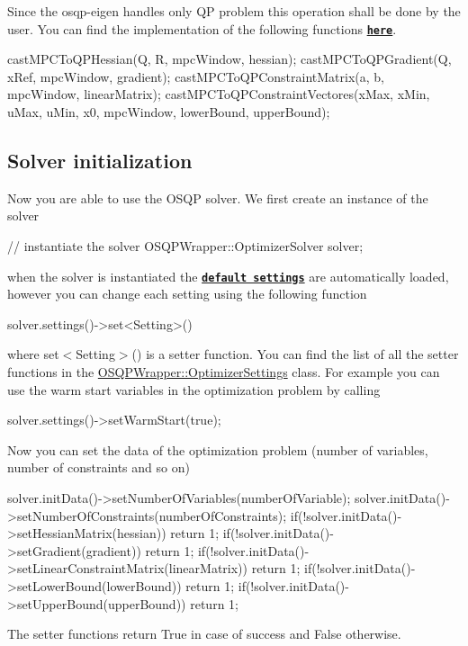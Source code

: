 Since the osqp-\/eigen handles only QP problem this operation shall be done by the user. You can find the implementation of the following functions \href{https://github.com/GiulioRomualdi/osqp-eigen/blob/master/example/src/MPCExample.cpp#L71-L182}{\tt {\bfseries here}}. 
\begin{DoxyCode}
castMPCToQPHessian(Q, R, mpcWindow, hessian);
castMPCToQPGradient(Q, xRef, mpcWindow, gradient);
castMPCToQPConstraintMatrix(a, b, mpcWindow, linearMatrix);
castMPCToQPConstraintVectores(xMax, xMin, uMax, uMin, x0, mpcWindow, lowerBound, upperBound);
\end{DoxyCode}
\hypertarget{index_OSQP_init}{}\subsection{Solver initialization}\label{index_OSQP_init}
Now you are able to use the O\+S\+QP solver. We first create an instance of the solver 
\begin{DoxyCode}
\textcolor{comment}{// instantiate the solver}
OSQPWrapper::OptimizerSolver solver;
\end{DoxyCode}
 when the solver is instantiated the \href{http://osqp.readthedocs.io/en/latest/interfaces/solver_settings.html}{\tt {\bfseries default settings}} are automatically loaded, however you can change each setting using the following function 
\begin{DoxyCode}
solver.settings()->set<Setting>()
\end{DoxyCode}
 where {\ttfamily set$<$\+Setting$>$()} is a setter function. You can find the list of all the setter functions in the {\ttfamily \hyperlink{classOSQPWrapper_1_1OptimizerSettings}{O\+S\+Q\+P\+Wrapper\+::\+Optimizer\+Settings}} class. For example you can use the warm start variables in the optimization problem by calling 
\begin{DoxyCode}
solver.settings()->setWarmStart(\textcolor{keyword}{true});
\end{DoxyCode}


Now you can set the data of the optimization problem (number of variables, number of constraints and so on) 
\begin{DoxyCode}
solver.initData()->setNumberOfVariables(numberOfVariable);
solver.initData()->setNumberOfConstraints(numberOfConstraints);
\textcolor{keywordflow}{if}(!solver.initData()->setHessianMatrix(hessian)) \textcolor{keywordflow}{return} 1;
\textcolor{keywordflow}{if}(!solver.initData()->setGradient(gradient)) \textcolor{keywordflow}{return} 1;
\textcolor{keywordflow}{if}(!solver.initData()->setLinearConstraintMatrix(linearMatrix)) \textcolor{keywordflow}{return} 1;
\textcolor{keywordflow}{if}(!solver.initData()->setLowerBound(lowerBound)) \textcolor{keywordflow}{return} 1;
\textcolor{keywordflow}{if}(!solver.initData()->setUpperBound(upperBound)) \textcolor{keywordflow}{return} 1;
\end{DoxyCode}
 The setter functions return {\ttfamily True} in case of success and {\ttfamily False} otherwise.

